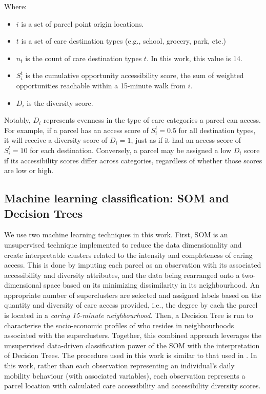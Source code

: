 \documentclass[
  authoryear,
  preprint,
  3p]{elsarticle}
\providecommand{\tightlist}{%
  \setlength{\itemsep}{0pt}\setlength{\parskip}{0pt}}\usepackage{longtable,booktabs,array}
\def\tightlist{}
\begin{document}
\noindent Where:

\begin{itemize}
\tightlist
\item
  \(i\) is a set of parcel point origin locations.
\item
  \(t\) is a set of care destination types (e.g., school, grocery, park,
  etc.)
\item
  \(n_t\) is the count of care destination types \(t\). In this work,
  this value is 14.
\item
  \(S_{i}^t\) is the cumulative opportunity accessibility score, the sum
  of weighted opportunities reachable within a 15-minute walk from
  \(i\).
\item
  \(D_i\) is the diversity score.
\end{itemize}

Notably, \(D_i\) represents evenness in the type of care categories a
parcel can access. For example, if a parcel has an access score of
\(S_i^t = 0.5\) for all destination types, it will receive a diversity
score of \(D_i = 1\), just as if it had an access score of
\(S_i^t = 10\) for each destination. Conversely, a parcel may be
assigned a low \(D_i\) score if its accessibility scores differ across
categories, regardless of whether those scores are low or high.

\subsection{Machine learning classification: SOM and Decision
Trees}\label{machine-learning-classification-som-and-decision-trees}

We use two machine learning techniques in this work. First, SOM is an
unsupervised technique implemented to reduce the data dimensionality and
create interpretable clusters related to the intensity and completeness
of caring access. This is done by imputing each parcel as an observation
with its associated accessibility and diversity attributes, and the data
being rearranged onto a two-dimensional space based on its minimizing
dissimilarity in its neighbourhood. An appropriate number of
superclusters are selected and assigned labels based on the quantity and
diversity of care access provided, i.e., the degree by each the parcel
is located in a \emph{caring 15-minute neighbourhood}. Then, a Decision
Tree is run to characterise the socio-economic profiles of who resides
in neighbourhoods associated with the superclusters. Together, this
combined approach leverages the unsupervised data-driven classification
power of the SOM with the interpretation of Decision Trees. The
procedure used in this work is similar to that used in
\citet{victorianoTimeSpaceMoney2020}. In this work, rather than each
observation representing an individual's daily mobility behaviour (with
associated variables), each observation represents a parcel location
with calculated care accessibility and accessibility diversity scores.
\end{document}
